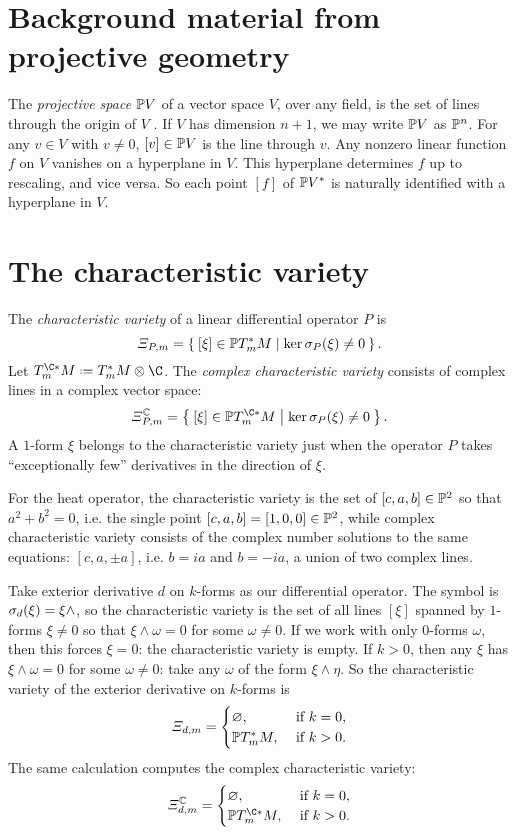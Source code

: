 \section{Background material from projective geometry}
The \emph{projective space} \(\Proj(V)\) of a vector space \(V\), over any field, is the set of lines through the origin of \(V\) \cite{Onishchik/Sulanke:2006}. If \(V\) has dimension \(n+1\), we may write \(\Proj(V)\) as \(\Proj^n\).
For any \(v \in V\) with \(v \ne 0\), \([v] \in \Proj(V)\) is the line through \(v\).
Any nonzero linear function \(f\) on \(V\) vanishes on a hyperplane in \(V\).
This hyperplane determines \(f\) up to rescaling, and vice versa.
So each point \([f]\) of \(\Proj(V^*)\) is naturally identified with a hyperplane in \(V\).

\section{The characteristic variety}
The \emph{characteristic variety} of a linear differential operator \(P\) is
\[
\charvariety[P]{m} = \Set{[\xi] \in \Proj(T^*_m M)|\ker \opsymbol[P]{\xi} \ne 0}.
\]
Let \(T_m^{\C*}M\defeq T_m^*M \otimes \C\).
The \emph{complex characteristic variety} consists of complex lines in a complex vector space:
\[
\complexcharvariety[P]{m} = \Set{[\xi] \in \Proj(T^{\C*}_m M) | \ker \opsymbol[P]{\xi} \ne 0}.
\]
A \(1\)-form \(\xi\) belongs to the characteristic variety just when the operator \(P\) takes ``exceptionally few'' derivatives in the direction of \(\xi\).
\begin{example}
For the heat operator, the characteristic variety is the set of \([c,a,b] \in \Proj^2\) so that \(a^2+b^2=0\), i.e. the single point \([c,a,b]=[1,0,0] \in \Proj^2\), while complex characteristic variety consists of the complex number solutions to the same equations: \([c,a,\pm a]\), i.e. \(b=ia\) and \(b=-ia\), a union of two complex lines.
\end{example}
\begin{example}
Take exterior derivative \(d\) on \(k\)-forms as our differential operator.
The symbol is
\(\opsymbol[d]{\xi}= \xi \wedge\), so the characteristic variety is the set of all lines \([\xi]\) spanned by \(1\)-forms \(\xi \ne 0\) so that \(\xi \wedge \omega=0\) for some \(\omega \ne 0\). 
If we work with only \(0\)-forms \(\omega\), then this forces \(\xi=0\): the characteristic variety is empty.
If \(k>0\), then any \(\xi\) has \(\xi \wedge \omega=0\) for some \(\omega \ne 0\): take any \(\omega\) of the form \(\xi \wedge \eta\).
So the characteristic variety of the exterior derivative on \(k\)-forms is
\[
\charvariety[d]{m} = 
\begin{cases}
\varnothing, & \text{ if \(k=0\)}, \\
\Proj(T^*_m M), & \text{ if \(k>0\)}.
\end{cases}
\]
The same calculation computes the complex characteristic variety:
\[
\complexcharvariety[d]{m} = 
\begin{cases}
\varnothing, & \text{ if \(k=0\)}, \\
\Proj(T^{\C*}_m M), & \text{ if \(k>0\)}.
\end{cases}
\]
\end{example}
